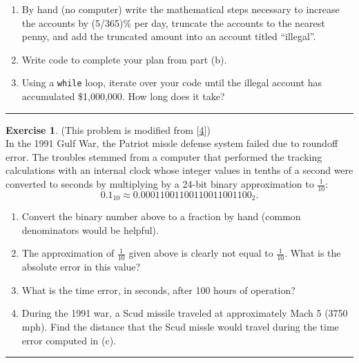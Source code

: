 \documentclass[
]{book}
\providecommand{\tightlist}{%
  \setlength{\itemsep}{0pt}\setlength{\parskip}{0pt}}
\theoremstyle{definition}
\theoremstyle{definition}
\theoremstyle{definition}
\newtheorem{exercise}{Exercise}[chapter]
\theoremstyle{remark}
\begin{document}
\begin{enumerate}
\def\labelenumi{\alph{enumi}.}
\setcounter{enumi}{1}
\tightlist
\item
  By hand (no computer) write the mathematical steps necessary to
  increase the accounts by (5/365)\% per day, truncate the accounts to
  the nearest penny, and add the truncated amount into an account
  titled ``illegal''.
\item
  Write code to complete your plan from part (b).
\item
  Using a \texttt{while} loop, iterate over your code until the illegal
  account has accumulated \$1,000,000. How long does it take?
\end{enumerate}

\begin{center}\rule{0.5\linewidth}{0.5pt}\end{center}

\begin{exercise}
\protect\hypertarget{exr:unnamed-chunk-65}{}{\label{exr:unnamed-chunk-65} }(This problem is modified from {[}\protect\hyperlink{ref-chartier}{4}{]})\\
In the 1991 Gulf War, the Patriot missle defense system failed due to
roundoff error. The troubles stemmed from a computer that performed the
tracking calculations with an internal clock whose integer values in
tenths of a second were converted to seconds by multiplying by a 24-bit
binary approximation to \(\frac{1}{10}\):
\[0.1_{10} \approx 0.00011001100110011001100_2.\]

\begin{enumerate}
\def\labelenumi{\alph{enumi}.}
\tightlist
\item
  Convert the binary number above to a fraction by hand (common
  denominators would be helpful).
\item
  The approximation of \(\frac{1}{10}\) given above is clearly not equal
  to \(\frac{1}{10}\). What is the absolute error in this value?
\item
  What is the time error, in seconds, after 100 hours of operation?
\item
  During the 1991 war, a Scud missile traveled at approximately Mach 5
  (3750 mph). Find the distance that the Scud missle would travel
  during the time error computed in (c).
\end{enumerate}
\end{exercise}

\begin{center}\rule{0.5\linewidth}{0.5pt}\end{center}
\end{document}
